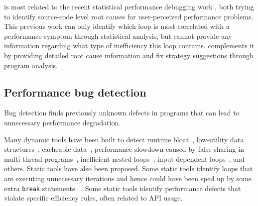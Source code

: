 \Tool is most related to
the recent statistical performance debugging work
\citep{SongOOPSLA2014}, both trying to identify source-code level root causes
for user-perceived performance problems. 
This previous work can only identify which loop is most correlated with 
a performance symptom through statistical analysis, 
but cannot provide any information
regarding what type of inefficiency this loop contains.
\Tool complements it by
providing detailed root cause information and fix strategy suggestions through
program analysis. 

\subsection{Performance bug detection}

Bug detection finds previously unknown defects in programs that can
lead to unnecessary performance degradation. 

Many dynamic tools have been built to detect
runtime bloat~\cite{Dufour:2008:STC:1453101.1453111, Xu:2009:GFP:1542476.1542523, Xu:2010:DIC:1806596.1806616}, 
low-utility data structures~\cite{Xu:2010:FLD:1806596.1806617}, 
cacheable data~\cite{Cachetor}, performance slowdown caused by false sharing in
multi-thread programs~\cite{Liu:2011:SPD:2048066.2048070},
inefficient nested loops~\cite{Alabama},
input-dependent loops~\cite{xiao13:context}, and others. 
Static tools have also been proposed. Some static tools identify loops 
that are executing 
unnecessary iterations and hence could have been sped up by some extra
\texttt{break} statements
~\cite{CARAMEL,IsilDillig.PLDI15}. 
Some static tools \cite{PerfBug} identify performance defects that violate
specific efficiency rules, often related to API usage. 

